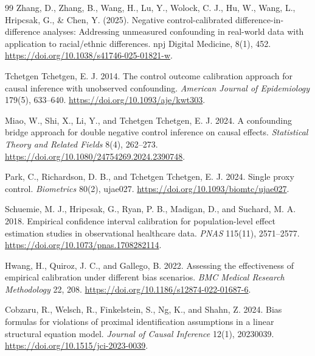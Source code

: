\begin{thebibliography}{99}
Zhang, D., Zhang, B., Wang, H., Lu, Y., Wolock, C. J., Hu, W., Wang, L., Hripcsak, G., \& Chen, Y. (2025). Negative control-calibrated difference-in-difference analyses: Addressing unmeasured confounding in real-world data with application to racial/ethnic differences. npj Digital Medicine, 8(1), 452. \url{https://doi.org/10.1038/s41746-025-01821-w}.

Tchetgen Tchetgen, E. J. 2014. The control outcome calibration approach for causal inference with unobserved confounding. \textit{American Journal of Epidemiology} 179(5), 633--640. \url{https://doi.org/10.1093/aje/kwt303}.

Miao, W., Shi, X., Li, Y., and Tchetgen Tchetgen, E. J. 2024. A confounding bridge approach for double negative control inference on causal effects. \textit{Statistical Theory and Related Fields} 8(4), 262--273. \url{https://doi.org/10.1080/24754269.2024.2390748}.

Park, C., Richardson, D. B., and Tchetgen Tchetgen, E. J. 2024. Single proxy control. \textit{Biometrics} 80(2), ujae027. \url{https://doi.org/10.1093/biomtc/ujae027}.

Schuemie, M. J., Hripcsak, G., Ryan, P. B., Madigan, D., and Suchard, M. A. 2018. Empirical confidence interval calibration for population-level effect estimation studies in observational healthcare data. \textit{PNAS} 115(11), 2571--2577. \url{https://doi.org/10.1073/pnas.1708282114}.

Hwang, H., Quiroz, J. C., and Gallego, B. 2022. Assessing the effectiveness of empirical calibration under different bias scenarios. \textit{BMC Medical Research Methodology} 22, 208. \url{https://doi.org/10.1186/s12874-022-01687-6}.

Cobzaru, R., Welsch, R., Finkelstein, S., Ng, K., and Shahn, Z. 2024. Bias formulas for violations of proximal identification assumptions in a linear structural equation model. \textit{Journal of Causal Inference} 12(1), 20230039. \url{https://doi.org/10.1515/jci-2023-0039}.


\end{thebibliography}
